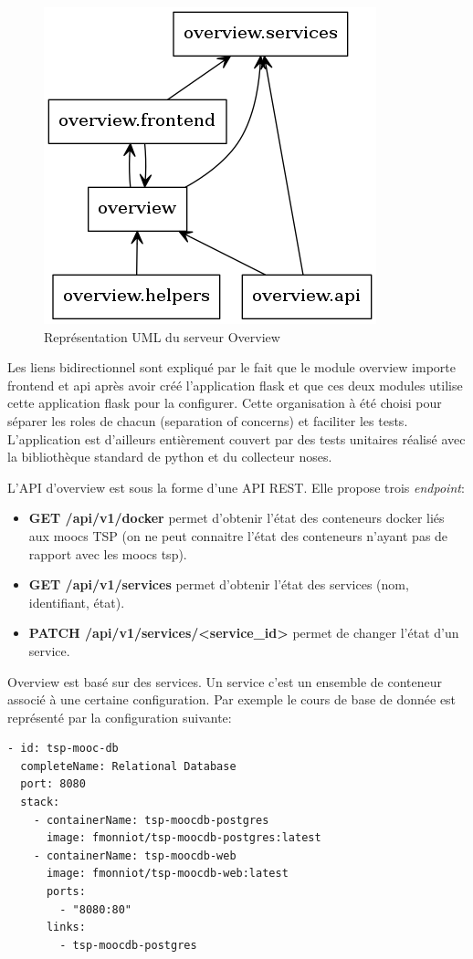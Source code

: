 \documentclass[a4paper,11pt]{report}
\begin{document}
\begin{figure}[h]
   \caption{\label{uml-overview-module} Représentation UML du serveur Overview}
   \centering
   \includegraphics[scale=0.8, keepaspectratio=true]{packages_overview.png}
\end{figure}

Les liens bidirectionnel sont expliqué par le fait que le module overview importe frontend et api après avoir créé l'application flask et que ces deux modules utilise cette application flask pour la configurer. Cette organisation à été choisi pour séparer les roles de chacun (separation of concerns) et faciliter les tests. L'application est d'ailleurs entièrement couvert par des tests unitaires réalisé avec la bibliothèque standard de python et du collecteur noses.

L'API d'overview est sous la forme d'une API REST. Elle propose trois \textit{endpoint}:
\begin{itemize}
  \item \textbf{GET /api/v1/docker} permet d'obtenir l'état des conteneurs docker liés aux moocs TSP (on ne peut connaitre l'état des conteneurs n'ayant pas de rapport avec les moocs tsp).
  \item \textbf{GET /api/v1/services} permet d'obtenir l'état des services (nom, identifiant, état).
  \item \textbf{PATCH /api/v1/services/<service\_id>} permet de changer l'état d'un service.
\end{itemize}

Overview est basé sur des services. Un service c'est un ensemble de conteneur associé à une certaine configuration. Par exemple le cours de base de donnée est représenté par la configuration suivante:
\begin{lstlisting}[caption={Configuration du service mooc-db}]
- id: tsp-mooc-db
  completeName: Relational Database
  port: 8080
  stack:
    - containerName: tsp-moocdb-postgres
      image: fmonniot/tsp-moocdb-postgres:latest
    - containerName: tsp-moocdb-web
      image: fmonniot/tsp-moocdb-web:latest
      ports:
        - "8080:80"
      links:
        - tsp-moocdb-postgres
\end{lstlisting}
\end{document}
